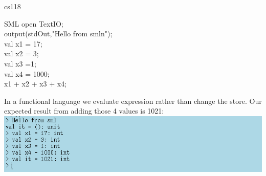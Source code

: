 \documentclass{article}
\begin{document}
cs118
\begin{GFT}{SML}
\+open TextIO;\\
\+output(stdOut,"Hello from sml\Backslash{}n");\\
\+val x1 = 17;\\
\+val x2 = 3;\\
\+val x3 =1;\\
\+val x4 = 1000;\\
\+x1 + x2 + x3 + x4;\\
\end{GFT}
In a functional language we evaluate expression rather than change the store. Our expected result from adding those 4 values is 1021: \\
\includegraphics{fig_sml.png}
\clearpage
\end{document}
